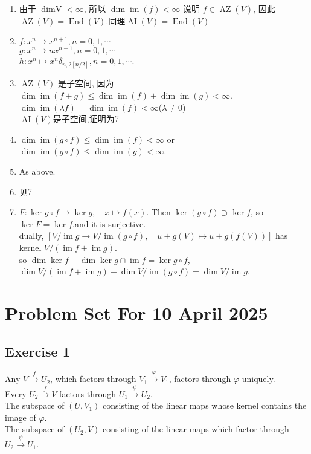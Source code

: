 \documentclass[11pt]{ctexart}
\theoremstyle{definition}
\numberwithin{equation}{section}
\newcommand{\op}[1]{\operatorname{#1}}%
\theoremstyle{definition}
\theoremstyle{remark}
\begin{document}
\begin{aaa}
    \begin{enumerate}
        \item 由于 $\op{dim V}<\infty$, 所以 $\op{dim}\op{im}(f)<\infty$ 说明 $f\in \op{AZ}(V)$, 因此 $\op{AZ}(V)=\op{End}(V)$.同理$\op{AI}(V)=\op{End}(V)$
        \item $f:x^n\mapsto x^{n+1},n=0,1,\cdots$\\ $g:x^n \mapsto nx^{n-1},n=0,1,\cdots$\\$h:x^n\mapsto x^n\delta_{n,2[n/2]},n=0,1,\cdots$.
        \item $\op{AZ}(V)$ 是子空间, 因为 $\op{dim}\op{im}(f+g)\leq \op{dim}\op{im}(f)+\op{dim}\op{im}(g)<\infty$.\\$\op{dim}\op{im}(\lambda f)=\op{dim}\op{im}(f)<\infty$($\lambda\neq 0$)\\$\op{AI}(V)$是子空间,证明为7
        \item $\op{dim}\op{im}(g\circ f)\leq \op{dim}\op{im}(f)<\infty$ or $\op{dim}\op{im}(g\circ f)\leq \op{dim}\op{im}(g)<\infty$.
        \item As above.
        \item 见7
        \item $F:\ker g\circ f\to \ker g,\quad x\mapsto f(x)$. Then $\ker (g\circ f)\supset\ker f  $, so $\ker F=\ker f$,and it is surjective. \\dually, $[V/\op{im}g \to V/\op{im}(g\circ f),\quad u+g(V)\mapsto u+g(f(V))]$ has kernel $V/(\op{im}f+\op{im}g)$.\\so $\dim\ker f+\dim\ker g\cap \op{im}f=\ker g\circ f$, $\dim V/(\op{im}f+\op{im}g)+\dim V/\op{im}(g\circ f)=\dim V/\op{im}g$.
    \end{enumerate}
\end{aaa}
\section{Problem Set For 10 April 2025}
\subsection{Exercise 1}
\begin{aaa}
Any $V \xrightarrow f U_2$, which factors through $V_1 \xrightarrow \varphi V_1$, factors through $\varphi$ uniquely.\\
Every $U_2 \xrightarrow f V$ factors through $U_1 \xrightarrow \psi U_2$.\\
The subspace of $(U, V_1)$ consisting of the linear maps whose kernel contains the image of $\varphi$.\\
The subspace of $(U_2, V)$ consisting of the linear maps which factor through $U_2 \xrightarrow \psi U_1$.
\end{aaa}
\end{document}
